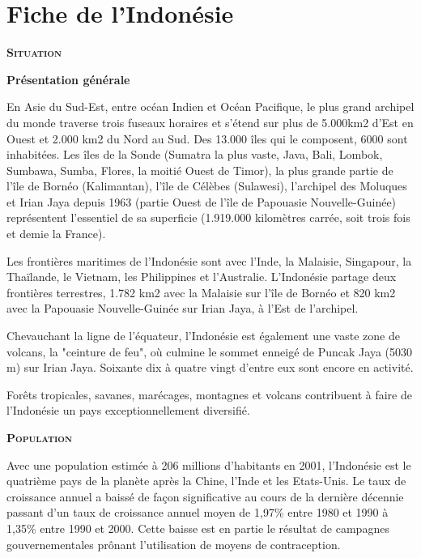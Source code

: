 \section{Fiche de l'Indonésie}



\textbf{\textsc{Situation}}

\textbf{Présentation générale}

En Asie du Sud-Est, entre océan Indien et Océan Pacifique, le plus grand archipel du monde traverse trois fuseaux horaires et s'étend sur plus de 5.000km2 d'Est en Ouest et 2.000 km2 du Nord au Sud. Des 13.000 îles qui le composent, 6000 sont inhabitées. Les îles de la Sonde (Sumatra la plus vaste, Java, Bali, Lombok, Sumbawa, Sumba, Flores, la moitié Ouest de Timor), la plus grande partie de l'île de Bornéo (Kalimantan), l'île de Célèbes (Sulawesi), l'archipel des Moluques et Irian Jaya depuis 1963 (partie Ouest de l'île de Papouasie Nouvelle-Guinée) représentent l'essentiel de sa superficie (1.919.000 kilomètres carrée, soit trois fois et demie la France).

Les frontières maritimes de l'Indonésie sont avec l'Inde, la Malaisie, Singapour, la Thaïlande, le Vietnam, les Philippines et l'Australie. L'Indonésie partage deux frontières terrestres, 1.782 km2 avec la Malaisie sur l'île de Bornéo et 820 km2 avec la Papouasie Nouvelle-Guinée sur Irian Jaya, à l'Est de l'archipel.

Chevauchant la ligne de l'équateur, l'Indonésie est également une vaste zone de volcans, la "ceinture de feu", où culmine le sommet enneigé de Puncak Jaya (5030 m) sur Irian Jaya. Soixante dix à quatre vingt d'entre eux sont encore en activité.

Forêts tropicales, savanes, marécages, montagnes et volcans contribuent à faire de l'Indonésie un pays exceptionnellement diversifié.

\textbf{\textsc{Population}}

Avec une population estimée à 206 millions d'habitants en 2001, l'Indonésie est le quatrième pays de la planète après la Chine, l'Inde et les Etats-Unis. Le taux de croissance annuel a baissé de façon significative au cours de la dernière décennie passant d'un taux de croissance annuel moyen de 1,97\% entre 1980 et 1990 à 1,35\% entre 1990 et 2000. Cette baisse est en partie le résultat de campagnes gouvernementales prônant l'utilisation de moyens de contraception.

